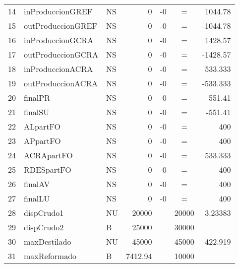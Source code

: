 \documentclass[a4paper,10pt]{article}
\begin{document}
\begin{flushleft}
\begin{tabular}{| l  l  l  r  r  c  r |}
     14 &   inProduccionGREF &       NS &               0 &              -0 &               = &         1044.78 \\ 
     15 &   outProduccionGREF &    NS &               0 &              -0 &               = &           -1044.78 \\ 
     16 &   inProduccionGCRA &       NS &               0 &              -0 &               = &         1428.57 \\ 
     17 &   outProduccionGCRA &    NS &               0 &              -0 &               = &           -1428.57 \\ 
     18 &   inProduccionACRA &       NS &               0 &              -0 &               = &         533.333 \\ 
     19 &   outProduccionACRA &    NS &               0 &              -0 &               = &           -533.333 \\ 
     20 &   finalPR &        NS &               0 &              -0 &               = &         -551.41 \\ 
     21 &   finalSU &        NS &               0 &              -0 &               = &         -551.41 \\ 
     22 &   ALpartFO &       NS &               0 &              -0 &               = &             400 \\ 
     23 &   APpartFO &       NS &               0 &              -0 &               = &             400 \\ 
     24 &   ACRApartFO &     NS &               0 &              -0 &               = &         533.333 \\ 
     25 &   RDESpartFO &     NS &               0 &              -0 &               = &             400 \\ 
     26 &   finalAV &        NS &               0 &              -0 &               = &             400 \\ 
     27 &   finalLU &        NS &               0 &              -0 &               = &             400 \\ \hline        
     28 &   dispCrudo1 &     NU &           20000 &                 &        20000   &         3.23383 \\ 
     29 &   dispCrudo2 &     B &            25000 &                &         30000   &  			\\ 
     30 &   maxDestilado &   NU &           45000 &                 &        45000   &         422.919 \\ 
     31 &   maxReformado &         B &          7412.94 &                  &       10000   &  			\\ 

\end{tabular}
\end{flushleft}
\end{document}
